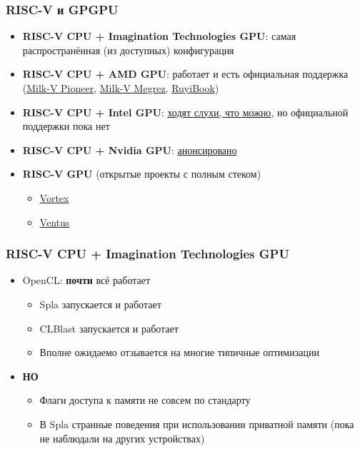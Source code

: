 \documentclass[xcolor=table,aspectratio=169]{beamer}
\begin{document}
\begin{frame}[fragile]
  \frametitle{RISC-V и GPGPU}
  \begin{itemize}
    \item \textbf{RISC-V CPU + Imagination Technologies GPU}: самая распространённая (из доступных) конфигурация
    \pause
    \item \textbf{RISC-V CPU + AMD GPU}: работает и есть официальная поддержка (\href{https://milkv.io/pioneer}{Milk-V Pioneer}, \href{https://riscv.org/ecosystem-news/2024/10/risc-v-cpu-demoed-with-rx-7900-xtx-gpu-in-debian-linux-amd-flagship-gpu-paired-with-milk-v-megrez-board-and-sifive-p550-cores/}{Milk-V Megrez}, \href{https://milkv.io/ruyibook}{RuyiBook})
    \item \textbf{RISC-V CPU + Intel GPU}: \href{https://www.reddit.com/r/RISCV/comments/1ftep9u/intel_arc_a770_on_riscv/}{ходят слухи, что можно}, но официальной поддержки пока нет
    \item \textbf{RISC-V CPU + Nvidia GPU}: \href{https://riscv.org/ecosystem-news/2025/07/nvidia-to-bring-cuda-platform-support-to-the-risc-v/}{анонсировано}
    \pause
    \item \textbf{RISC-V GPU} (открытые проекты с полным стеком)
    \begin{itemize}
      \item \href{https://github.com/vortexgpgpu/vortex}{Vortex}
      \item \href{https://github.com/THU-DSP-LAB/ventus-gpgpu}{Ventus}
    \end{itemize}
  \end{itemize}
\end{frame}

\begin{frame}
  \frametitle{RISC-V CPU + Imagination Technologies GPU} %
\begin{itemize}
  \item OpenCL: \textbf{почти} всё работает
  \begin{itemize}
    \item Spla запускается и работает
    \item CLBlast запускается и работает
    \item Вполне ожидаемо отзывается на многие типичные оптимизации
  \end{itemize}
  \pause
  \item \textbf{НО}
  \begin{itemize}
    \item Флаги доступа к памяти не совсем по стандарту
    \item В Spla странные поведения при использовании приватной памяти (пока не наблюдали на других устройствах)
  \end{itemize}
\end{itemize}
\end{frame}
\end{document}
